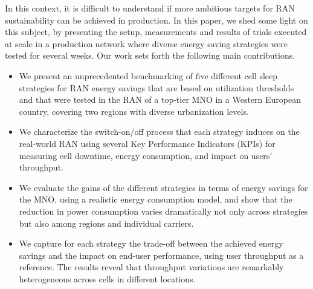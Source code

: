 In this context, it is difficult to understand if more ambitious targets for RAN sustainability can be achieved in production. In this paper, we shed some light on this subject, by presenting the setup, measurements and results of trials executed at scale in a production network where diverse energy saving strategies were tested for several weeks. Our work sets forth the following main contributions.
\begin{itemize}[leftmargin=*]
    \item We present an unprecedented benchmarking of five different cell sleep strategies for %
    RAN energy savings that are based on %
    utilization thresholds and %
    that were tested in the RAN of a top-tier MNO in a Western European country, covering two regions with diverse urbanization levels.
    \item We characterize the switch-on/off process that each strategy induces on the real-world RAN using several Key Performance Indicators (KPIs) for measuring cell downtime, energy consumption, and impact on users' throughput.
    \item We evaluate the gains of the different strategies in terms of energy savings for the MNO, using a realistic energy consumption model, and show that the reduction in power consumption varies dramatically not only across strategies but also among regions and individual carriers.
    \item We capture for each strategy the trade-off between the achieved energy savings and %
    the impact on end-user performance, using user throughput as a reference. The results reveal that throughput variations are remarkably heterogeneous across cells in different locations.
\end{itemize}


